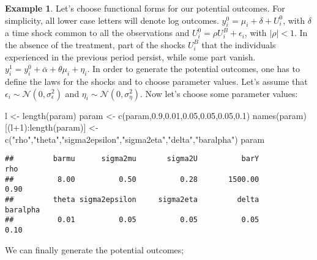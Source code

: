 \documentclass[
]{book}
\newenvironment{Shaded}{\begin{snugshade}}{\end{snugshade}}
\newcommand{\DecValTok}[1]{\textcolor[rgb]{0.00,0.00,0.81}{#1}}
\newcommand{\FloatTok}[1]{\textcolor[rgb]{0.00,0.00,0.81}{#1}}
\newcommand{\FunctionTok}[1]{\textcolor[rgb]{0.00,0.00,0.00}{#1}}
\newcommand{\NormalTok}[1]{#1}
\newcommand{\OtherTok}[1]{\textcolor[rgb]{0.56,0.35,0.01}{#1}}
\newcommand{\SpecialCharTok}[1]{\textcolor[rgb]{0.00,0.00,0.00}{#1}}
\newcommand{\StringTok}[1]{\textcolor[rgb]{0.31,0.60,0.02}{#1}}
\theoremstyle{definition}
\theoremstyle{definition}
\newtheorem{example}{Example}[chapter]
\theoremstyle{definition}
\theoremstyle{definition}
\theoremstyle{remark}
\begin{document}
\begin{example}
\protect\hypertarget{exm:unnamed-chunk-3}{}{\label{exm:unnamed-chunk-3} }Let's choose functional forms for our potential outcomes.
For simplicity, all lower case letters will denote log outcomes.
\(y_i^0=\mu_i+\delta+U_i^0\), with \(\delta\) a time shock common to all the observations and \(U_i^0=\rho U_i^B+\epsilon_i\), with \(|\rho|<1\).
In the absence of the treatment, part of the shocks \(U_i^B\) that the individuals experienced in the previous period persist, while some part vanish.
\(y_i^1=y_i^0+\bar{\alpha}+\theta\mu_i+\eta_i\).
In order to generate the potential outcomes, one has to define the laws for the shocks and to choose parameter values.
Let's assume that \(\epsilon_i\sim\mathcal{N}(0,\sigma^2_{\epsilon})\) and \(\eta_i\sim\mathcal{N}(0,\sigma^2_{\eta})\).
Now let's choose some parameter values:
\end{example}

\begin{Shaded}
\begin{Highlighting}[]
\NormalTok{l }\OtherTok{\textless{}{-}} \FunctionTok{length}\NormalTok{(param)}
\NormalTok{param }\OtherTok{\textless{}{-}} \FunctionTok{c}\NormalTok{(param,}\FloatTok{0.9}\NormalTok{,}\FloatTok{0.01}\NormalTok{,}\FloatTok{0.05}\NormalTok{,}\FloatTok{0.05}\NormalTok{,}\FloatTok{0.05}\NormalTok{,}\FloatTok{0.1}\NormalTok{)}
\FunctionTok{names}\NormalTok{(param)[(l}\SpecialCharTok{+}\DecValTok{1}\NormalTok{)}\SpecialCharTok{:}\FunctionTok{length}\NormalTok{(param)] }\OtherTok{\textless{}{-}} \FunctionTok{c}\NormalTok{(}\StringTok{"rho"}\NormalTok{,}\StringTok{"theta"}\NormalTok{,}\StringTok{"sigma2epsilon"}\NormalTok{,}\StringTok{"sigma2eta"}\NormalTok{,}\StringTok{"delta"}\NormalTok{,}\StringTok{"baralpha"}\NormalTok{)}
\NormalTok{param}
\end{Highlighting}
\end{Shaded}

\begin{verbatim}
##         barmu      sigma2mu       sigma2U          barY           rho 
##          8.00          0.50          0.28       1500.00          0.90 
##         theta sigma2epsilon     sigma2eta         delta      baralpha 
##          0.01          0.05          0.05          0.05          0.10
\end{verbatim}

We can finally generate the potential outcomes;
\end{document}
